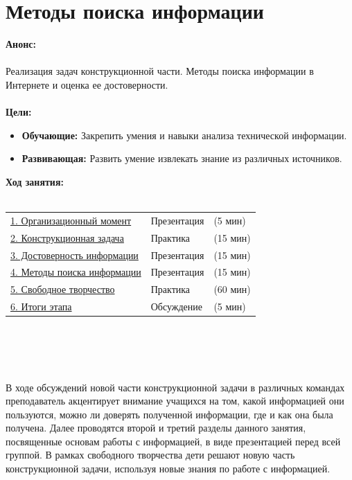 \chapter{Методы поиска информации}
{\bfseries Анонс:}\\\\
Реализация задач конструкционной части. Методы поиска информации в Интернете и оценка ее достоверности.\\\\
{\bfseries Цели:}
\begin{itemize}
	\item{}{\bfseries Обучающие:} Закрепить умения и навыки анализа  технической информации. 
	\item{}{\bfseries Развивающая:} Развить умение извлекать знание из различных источников.\\
\end{itemize}	
{\bfseries Ход занятия:}\\\\
\begin{tabular}[h!]{lll}
	{\hyperlink{lesson26x1}{1. Организационный момент}}&{Презентация}&{(5 мин)}\\
	{\hyperlink{lesson26x2}{2. Конструкционная задача}}&{Практика}&{(15 мин)}\\
	{\hyperlink{lesson26x3}{3. Достоверность информации}}&{Презентация}&{(15 мин)}\\
	{\hyperlink{lesson26x4}{4. Методы поиска информации}}&{Презентация}&{(15 мин)}\\
	{\hyperlink{lesson26x5}{5. Свободное творчество}}&{Практика}&{(60 мин)}\\
	{\hyperlink{lesson26x6}{6. Итоги этапа}}&{Обсуждение}&{(5 мин)}\\
\end{tabular}\\\\

{\hypertarget{lesson26x1}{}}\\\\	

В ходе обсуждений новой части конструкционной задачи  в различных командах преподаватель акцентирует внимание учащихся на том, какой информацией они пользуются, можно ли доверять полученной информации, где и как она была получена. Далее проводятся второй и третий разделы данного занятия, посвященные основам работы с информацией, в виде презентацией перед всей группой. В рамках свободного творчества дети решают новую часть конструкционной задачи, используя новые знания по работе с информацией.\\\\

